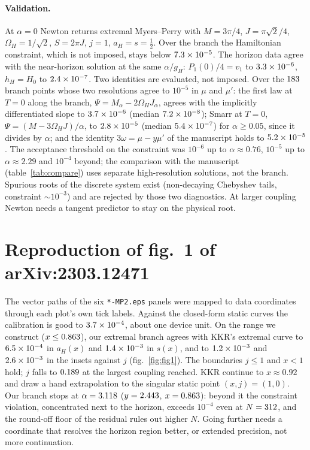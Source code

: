 \documentclass[11pt,a4paper]{article}
\begin{document}
\paragraph{Validation.} At $\alpha=0$ Newton returns extremal Myers--Perry with
$M=3\pi/4$, $J=\pi\sqrt2/4$, $\Omega_H=1/\sqrt2$, $S=2\pi J$, $j=1$,
$a_H=s=\tfrac12$. Over the branch the Hamiltonian constraint, which is not
imposed, stays below $7.3\times10^{-5}$. The horizon data agree with the
near-horizon solution at the same $\alpha/g_H$: $P_1(0)/4=v_1$ to $3.3\times10^{-6}$,
$h_H=H_0$ to $2.4\times10^{-7}$. Two identities are evaluated, not imposed. Over the $183$ branch points whose two resolutions agree to
$10^{-5}$ in $\mu$ and $\mu'$: the first law at $T=0$ along the branch,
$\Psi=M_\alpha-2\Omega_HJ_\alpha$, agrees with the implicitly differentiated slope
to $3.7\times10^{-6}$ (median $7.2\times10^{-8}$); Smarr at $T=0$,
$\Psi=(M-3\Omega_HJ)/\alpha$, to $2.8\times10^{-5}$ (median $5.4\times10^{-7}$) for
$\alpha\ge0.05$, since it divides by $\alpha$; and the identity
$3\omega=\mu-y\mu'$ of the manuscript holds to $5.2\times10^{-5}$. The acceptance threshold on the constraint was $10^{-6}$ up to $\alpha\approx0.76$,
$10^{-5}$ up to $\alpha\approx2.29$ and $10^{-4}$ beyond; the comparison with the
manuscript (table~\ref{tab:compare}) uses separate high-resolution solutions, not
the branch. Spurious roots of the discrete system exist (non-decaying
Chebyshev tails, constraint $\sim10^{-3}$) and are rejected by those two
diagnostics. At larger coupling Newton needs a tangent predictor to stay on the
physical root.

\section{Reproduction of fig.~1 of arXiv:2303.12471}

The vector paths of the six \texttt{*-MP2.eps} panels were mapped to data
coordinates through each plot's own tick labels. Against the closed-form static
curves the calibration is good to $3.7\times10^{-4}$, about one device unit. On the
range we construct ($x\le0.863$), our extremal branch agrees with KKR's extremal
curve to $6.5\times10^{-4}$ in $a_H(x)$ and $1.4\times10^{-3}$ in $s(x)$, and to $1.2\times10^{-3}$
and $2.6\times10^{-3}$ in the insets against $j$ (fig.~\ref{fig:fig1}). The boundaries
$j\le1$ and $x<1$ hold; $j$ falls to $0.189$ at the largest coupling reached.
KKR continue to $x\approx0.92$ and draw a hand extrapolation to the singular static
point $(x,j)=(1,0)$. Our branch stops at $\alpha=3.118$ ($y=2.443$,
$x=0.863$): beyond it the constraint violation, concentrated next to the
horizon, exceeds $10^{-4}$ even at $N=312$, and the round-off floor of the
residual rules out higher $N$. Going further needs a coordinate that resolves the
horizon region better, or extended precision, not more continuation.
\end{document}
